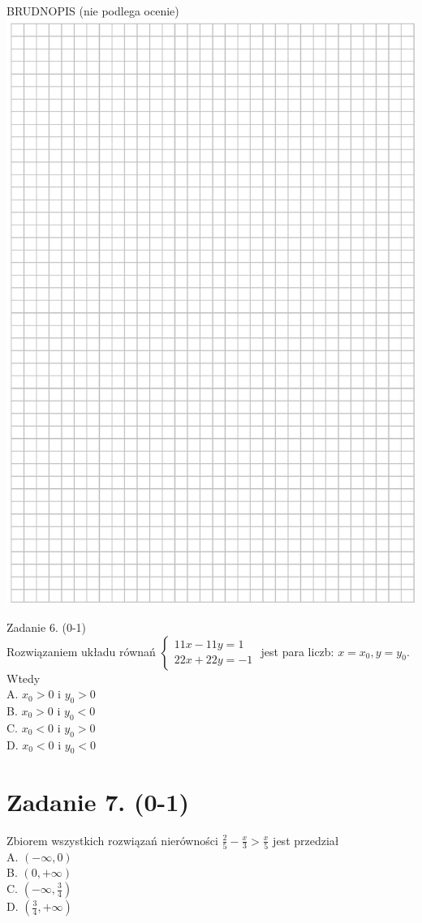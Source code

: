 \documentclass[10pt]{article}
\begin{document}
BRUDNOPIS (nie podlega ocenie)\\
\includegraphics[max width=\textwidth, center]{2024_11_21_465acd0c12fa3e05e8a7g-03}

Zadanie 6. (0-1)\\
Rozwiązaniem układu równań \(\left\{\begin{array}{l}11 x-11 y=1 \\ 22 x+22 y=-1\end{array}\right.\) jest para liczb: \(x=x_{0}, y=y_{0}\). Wtedy\\
A. \(x_{0}>0\) i \(y_{0}>0\)\\
B. \(x_{0}>0\) i \(y_{0}<0\)\\
C. \(x_{0}<0\) i \(y_{0}>0\)\\
D. \(x_{0}<0\) i \(y_{0}<0\)

\section*{Zadanie 7. (0-1)}
Zbiorem wszystkich rozwiązań nierówności \(\frac{2}{5}-\frac{x}{3}>\frac{x}{5}\) jest przedział\\
A. \((-\infty, 0)\)\\
B. \((0,+\infty)\)\\
C. \(\left(-\infty, \frac{3}{4}\right)\)\\
D. \(\left(\frac{3}{4},+\infty\right)\)
\end{document}
